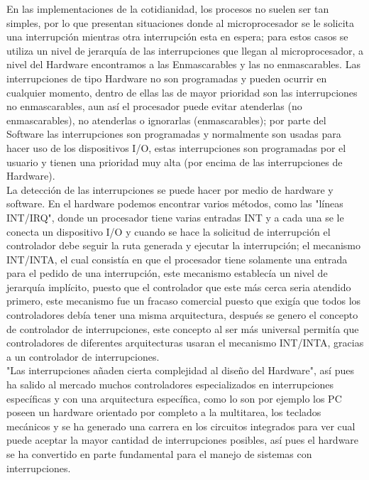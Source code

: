 \documentclass{article}
\begin{document}
En las implementaciones de la cotidianidad, los procesos no suelen ser tan simples, por lo que presentan situaciones donde al microprocesador se \cite{Jho2} le solicita una interrupción mientras otra interrupción esta en espera; para estos casos se utiliza un nivel de jerarquía de las interrupciones que llegan al microprocesador, a nivel del Hardware encontramos a las Enmascarables y las no enmascarables. Las interrupciones de tipo Hardware no son programadas y pueden ocurrir en cualquier momento, dentro de ellas las de mayor prioridad son las interrupciones no enmascarables, aun así el procesador puede evitar atenderlas (no enmascarables), no atenderlas o ignorarlas (enmascarables); por parte del Software las interrupciones son programadas y normalmente son usadas para hacer uso de los dispositivos  I/O, estas interrupciones son programadas por el usuario y tienen una prioridad muy alta (por encima de las interrupciones de Hardware).\\

La detección de las interrupciones se puede hacer por medio de hardware y software. En el hardware podemos encontrar varios métodos, como las \cite{Ser} "líneas INT/IRQ", donde un procesador tiene varias entradas INT y a cada una se le conecta un dispositivo I/O y cuando se hace la solicitud de interrupción el controlador debe seguir la ruta generada y ejecutar la interrupción; el mecanismo INT/INTA, el cual consistía en que el procesador tiene solamente una entrada para el pedido de una interrupción, este mecanismo establecía un nivel de jerarquía implícito, puesto que el controlador que este más cerca seria atendido primero, este mecanismo fue un fracaso comercial puesto que exigía que todos los controladores debía tener una misma arquitectura, después se genero el concepto de controlador de interrupciones, este concepto al ser más universal permitía que controladores de diferentes arquitecturas usaran el mecanismo INT/INTA, gracias a un controlador de interrupciones.\\

\cite{Dan} "Las interrupciones añaden cierta complejidad al diseño del Hardware", así pues ha salido al mercado muchos controladores especializados en interrupciones específicas y con una arquitectura específica, como lo son por ejemplo los PC poseen un hardware orientado por completo a la multitarea, los teclados mecánicos y se ha generado una carrera en los circuitos integrados para ver cual puede aceptar la mayor cantidad de interrupciones  posibles, así pues el hardware se ha convertido en parte fundamental para el manejo de sistemas con interrupciones.\\
\end{document}
